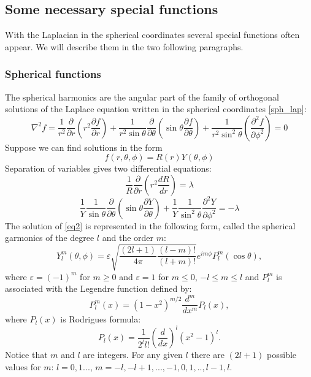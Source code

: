 \documentclass[a4paper, 11pt]{article}
\begin{document}
\subsection{Some  necessary special functions}
With the Laplacian in the spherical coordinates several special functions often appear.  We will describe them in the two following paragraphs.
\subsubsection{Spherical functions}
The spherical harmonics are the angular part of the family of orthogonal solutions of the Laplace equation written in the spherical coordinates \eqref{sph_lap}:
$$\nabla^2 {f} = \frac{1}{r^2} \frac{\partial}{\partial r}({r^2}\frac{\partial f}{\partial r})+\frac{1}{r^2\sin{\theta}}\frac{\partial}{\partial \theta}(\sin{\theta}\frac{\partial f}{\partial \theta})+\frac{1}{r^2\sin^2{\theta}}(\frac{\partial^2 f}{\partial \phi^2}) = 0$$
Suppose we can find solutions in the form $$f({r}, \theta, \phi) = R(r)Y(\theta, \phi)$$
Separation of variables gives two differential equations:
$$\frac{1}{R}\frac{\partial}{\partial r}(r^2 \frac {dR}{dr}) = \lambda$$
\begin{equation}\label{eq2}
	\frac{1}{Y}\frac{1}{\sin{\theta}}\frac{\partial}{\partial \theta}(\sin{\theta}\frac{\partial Y}{\partial \theta})+\frac{1}{Y}\frac{1}{\sin^2{\theta}}\frac{\partial^2 Y}{\partial \phi^2} = -\lambda
\end{equation}
The solution of \eqref{eq2} is represented in the following form, called the spherical garmonics of the degree $l$ and the order $m$:
\begin{equation}\label{sph_garm}   
   Y_l^m(\theta, \phi)=\varepsilon \sqrt{\frac{(2l+1)}{4\pi}\frac{(l-m)!}{(l+m)!}}e^{im\phi}P_l^m(\cos{\theta}),
\end{equation}
 where $\varepsilon = (-1)^m$ for $m\geq0$ and $\varepsilon=1$ for $m \leq 0$, $-l \leq m \leq l$ and $P_l^m $ is associated with the Legendre function defined by:
	$$P_l^m(x)= (1-x^2)^{m/2}\frac{d^m}{dx^m} P_l(x),$$
where $P_l(x) $ is Rodrigues formula:
	$$P_l(x) = \frac{1}{2^l l!}(\frac{d}{dx})^l (x^2-1)^l.$$
Notice that $m$ and $l$ are integers. For any given $l$ there are $(2l+1)$ possible values for $m$: $l=0, 1...$, $m = -l, -l+1,..., -1, 0, 1, .., l-1, l.$\\
\end{document}
